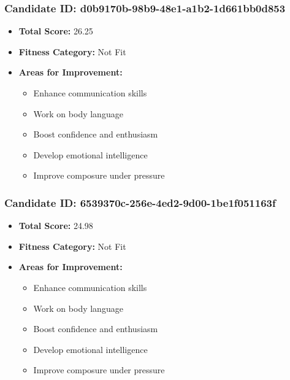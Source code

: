 \documentclass{article}
\begin{document}
\subsubsection{Candidate ID: d0b9170b-98b9-48e1-a1b2-1d661bb0d853}
\begin{itemize}
    \item \textbf{Total Score:} 26.25
    \item \textbf{Fitness Category:} Not Fit
    \item \textbf{Areas for Improvement:}
    \begin{itemize}
        \item Enhance communication skills
        \item Work on body language
        \item Boost confidence and enthusiasm
        \item Develop emotional intelligence
        \item Improve composure under pressure
    \end{itemize}
\end{itemize}

\subsubsection{Candidate ID: 6539370c-256e-4ed2-9d00-1be1f051163f}
\begin{itemize}
    \item \textbf{Total Score:} 24.98
    \item \textbf{Fitness Category:} Not Fit
    \item \textbf{Areas for Improvement:}
    \begin{itemize}
        \item Enhance communication skills
        \item Work on body language
        \item Boost confidence and enthusiasm
        \item Develop emotional intelligence
        \item Improve composure under pressure
    \end{itemize}
\end{itemize}
\end{document}
